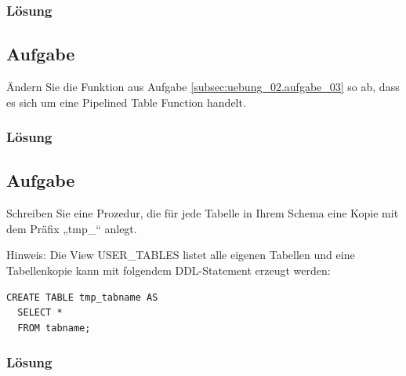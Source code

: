 \subsubsection*{Lösung}
\label{subsubsec:uebung_02.aufgabe_03.loesung}


\subsection{Aufgabe}
\label{subsec:uebung_02.aufgabe_04}
Ändern Sie die Funktion aus Aufgabe \ref{subsec:uebung_02.aufgabe_03} so ab, dass es sich um eine Pipelined Table Function handelt.

\subsubsection*{Lösung}
\label{subsubsec:uebung_02.aufgabe_04.loesung}


\subsection{Aufgabe}
\label{subsec:uebung_02.aufgabe_05}
Schreiben Sie eine Prozedur, die für jede Tabelle in Ihrem Schema eine Kopie mit dem Präfix „tmp\_“ anlegt.

Hinweis: Die View USER\_TABLES listet alle eigenen Tabellen und eine Tabellenkopie kann mit folgendem DDL-Statement erzeugt werden:
\begin{verbatim}
CREATE TABLE tmp_tabname AS
  SELECT *
  FROM tabname;
\end{verbatim}

\subsubsection*{Lösung}
\label{subsubsec:uebung_02.aufgabe_05.loesung}


